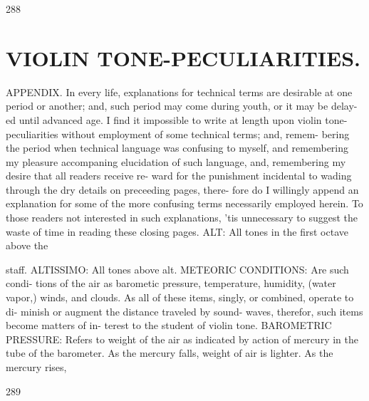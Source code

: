 \documentclass{article}
\begin{document}
288

\section*{VIOLIN TONE-PECULIARITIES.}
APPENDIX. In every life, explanations for technical terms are desirable at one period or another; and, such period may come during youth, or it may be delay- ed until advanced age. I find it impossible to write at length upon violin tone-peculiarities without employment of some technical terms; and, remem- bering the period when technical language was confusing to myself, and remembering my pleasure accompaning elucidation of such language, and, remembering my desire that all readers receive re- ward for the punishment incidental to wading through the dry details on preceeding pages, there- fore do I willingly append an explanation for some of the more confusing terms necessarily employed herein. To those readers not interested in such explanations, 'tis unnecessary to suggest the waste of time in reading these closing pages. ALT: All tones in the first octave above the

staff. ALTISSIMO: All tones above alt. METEORIC CONDITIONS: Are such condi- tions of the air as barometic pressure, temperature, humidity, (water vapor,) winds, and clouds. As all of these items, singly, or combined, operate to di- minish or augment the distance traveled by sound- waves, therefor, such items become matters of in- terest to the student of violin tone. BAROMETRIC PRESSURE: Refers to weight of the air as indicated by action of mercury in the tube of the barometer. As the mercury falls, weight of air is lighter. As the mercury rises,

289
\end{document}
